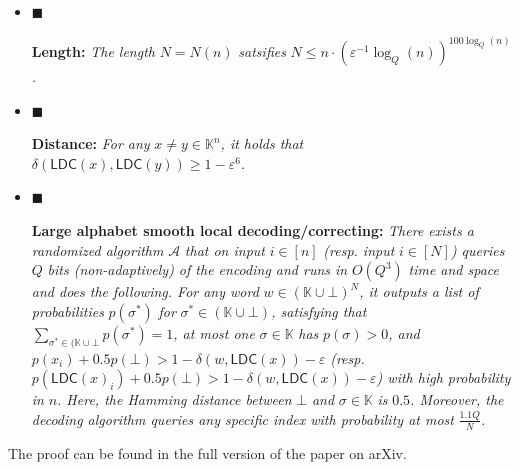 \documentclass[10pt,a4paper]{article}
\begin{document}
\begin{itemize}


\item[] 
$\blacksquare$ 


\textbf{Length:}\emph{ The length }$N=N(n)$\emph{ satsifies }$N\leq n\cdot(\varepsilon^{-1}\log_{Q}(n))^{100\log_{Q}(n)}$\emph{.}\par





\item[] 
$\blacksquare$ 


\textbf{Distance:}\emph{
For any }$x\not=y\in\mathbb{K}^{n}$\emph{, it holds that }$\delta(\mathsf{LDC}(x),\mathsf{LDC}(y))\geq 1-\varepsilon^{6}$\emph{.}\par





\item[] 
$\blacksquare$ 


\textbf{Large alphabet smooth local decoding/correcting:}\emph{
There exists a randomized algorithm }$\mathcal{A}$\emph{ that on input }$i\in[n]$\emph{ (resp. input }$i\in[N]$\emph{) queries }$Q$\emph{ bits (non-adaptively) of the encoding and runs in }$O(Q^{3})$\emph{ time and space and does the following. For any word }$w\in(\mathbb{K}\cup\bot)^{N}$\emph{, it outputs a list of probabilities }$p(\sigma^{*})$\emph{ for }$\sigma^{*}\in(\mathbb{K}\cup\bot)$\emph{, satisfying that }$\sum_{\sigma^{*}\in(\mathbb{K}\cup\bot}p(\sigma^{*})=1$\emph{, at most one }$\sigma\in\mathbb{K}$\emph{ has }$p(\sigma)>0$\emph{, and }$p(x_{i})+0.5p(\bot)>1-\delta(w,\mathsf{LDC}(x))-\varepsilon$\emph{ (resp. }$p(\mathsf{LDC}(x)_{i})+0.5p(\bot)>1-\delta(w,\mathsf{LDC}(x))-\varepsilon$\emph{) with high probability in }$n$\emph{. Here, the Hamming distance between }$\bot$\emph{ and }$\sigma\in\mathbb{K}$\emph{ is }$0.5$\emph{.
Moreover, the decoding algorithm queries any specific index with probability at most }$\frac{1.1Q}{N}$\emph{.}\par





\end{itemize}






The proof can be found in the full version of the paper on arXiv.\par
\end{document}
